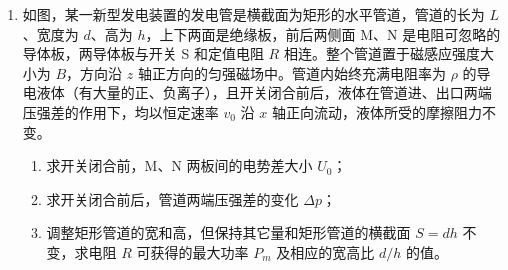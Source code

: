 \documentclass[\gkver]{gaokaozhenti}
\begin{document}
\begin{enumerate}
\begin{enumerate}
	\item
	若游客从 A 点由静止开始滑下，到 B 点时沿切线方向滑离轨道落在水面 D 点，$OD=2R$，求游客滑到 B 点时的速度 $v_{B}$ 大小及运动过程轨道摩擦力对其所做的功 $W_{f}$；
	\item
	若游客从 AB 段某处滑下，恰好停在 B 点，又因为受到微小扰动，继续沿圆弧轨道滑到 P 点后滑离轨道，求 P 点离水面的高度 $h$。（提示：在圆周运动过程中任一点，质点所受的向心力与其速率的关系为 $F_{\text{向}} = m\frac{v^{2}}{R}$）
\end{enumerate}


\item
如图，某一新型发电装置的发电管是横截面为矩形的水平管道，管道的长为 $L$、宽度为 $d$、高为 $h$，上下两面是绝缘板，前后两侧面 M、N 是电阻可忽略的导体板，两导体板与开关 S 和定值电阻 $R$ 相连。整个管道置于磁感应强度大小为 $B$，方向沿 $z$ 轴正方向的匀强磁场中。管道内始终充满电阻率为 $\rho$ 的导电液体（有大量的正、负离子），且开关闭合前后，液体在管道进、出口两端压强差的作用下，均以恒定速率 $v_{0}$ 沿 $x$ 轴正向流动，液体所受的摩擦阻力不变。

\begin{enumerate}
	\item
	求开关闭合前，M、N 两板间的电势差大小 $U_{0}$；
	\item
	求开关闭合前后，管道两端压强差的变化 $\Delta p$；
	\item
	调整矩形管道的宽和高，但保持其它量和矩形管道的横截面 $S=dh$ 不变，求电阻 $R$ 可获得的最大功率 $P_{m}$ 及相应的宽高比 $d/h$ 的值。
\end{enumerate}


\end{enumerate}
\end{document}
